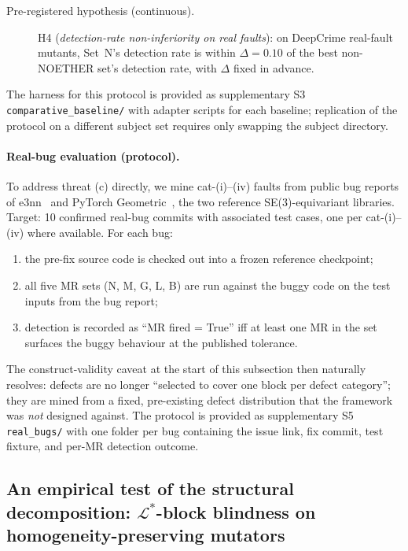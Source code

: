 \documentclass[manuscript]{acmart}
\begin{document}
\begin{description}
  \item[Pre-registered hypothesis (continuous).] H4 (\emph{detection-rate non-inferiority on real faults}): on DeepCrime real-fault mutants, Set~N's detection rate is within $\Delta = 0.10$ of the best non-NOETHER set's detection rate, with $\Delta$ fixed in advance.
\end{description}

The harness for this protocol is provided as supplementary S3 \texttt{comparative\_baseline/} with adapter scripts for each baseline; replication of the protocol on a different subject set requires only swapping the subject directory.

\paragraph{Real-bug evaluation (protocol).}
\label{para:real-bug-protocol}
To address threat (c) directly, we mine cat-(i)--(iv) faults from public bug reports of e3nn~\cite{e3nn2022software} and PyTorch Geometric~\cite{Fey2019PyG}, the two reference SE(3)-equivariant libraries. Target: 10 confirmed real-bug commits with associated test cases, one per cat-(i)--(iv) where available. For each bug:
\begin{enumerate}[leftmargin=*,nosep]
  \item the pre-fix source code is checked out into a frozen reference checkpoint;
  \item all five MR sets (N, M, G, L, B) are run against the buggy code on the test inputs from the bug report;
  \item detection is recorded as ``MR fired = True'' iff at least one MR in the set surfaces the buggy behaviour at the published tolerance.
\end{enumerate}
The construct-validity caveat at the start of this subsection then naturally resolves: defects are no longer ``selected to cover one block per defect category''; they are mined from a fixed, pre-existing defect distribution that the framework was \emph{not} designed against. The protocol is provided as supplementary S5 \texttt{real\_bugs/} with one folder per bug containing the issue link, fix commit, test fixture, and per-MR detection outcome.

\subsection{An empirical test of the structural decomposition: \texorpdfstring{$\mathcal{L}^{*}$}{L*}-block blindness on homogeneity-preserving mutators}
\label{sec:empirical-vs-sota}
\end{document}
